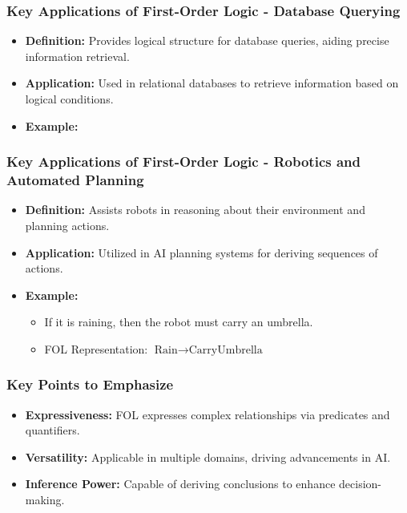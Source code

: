 \documentclass[aspectratio=169]{beamer}
\begin{document}
\begin{frame}[fragile]
    \frametitle{Key Applications of First-Order Logic - Database Querying}
    \begin{itemize}
        \item \textbf{Definition:} Provides logical structure for database queries, aiding precise information retrieval.
        \item \textbf{Application:} Used in relational databases to retrieve information based on logical conditions.
        \item \textbf{Example:}
    \end{itemize}
\end{frame}

\begin{frame}[fragile]
    \frametitle{Key Applications of First-Order Logic - Robotics and Automated Planning}
    \begin{itemize}
        \item \textbf{Definition:} Assists robots in reasoning about their environment and planning actions.
        \item \textbf{Application:} Utilized in AI planning systems for deriving sequences of actions.
        \item \textbf{Example:}
            \begin{itemize}
                \item If it is raining, then the robot must carry an umbrella.
                \item FOL Representation: $ \rightarrow {}$
            \end{itemize}
    \end{itemize}
\end{frame}

\begin{frame}[fragile]
    \frametitle{Key Points to Emphasize}
    \begin{itemize}
        \item \textbf{Expressiveness:} FOL expresses complex relationships via predicates and quantifiers.
        \item \textbf{Versatility:} Applicable in multiple domains, driving advancements in AI.
        \item \textbf{Inference Power:} Capable of deriving conclusions to enhance decision-making.
    \end{itemize}
\end{frame}
\end{document}
